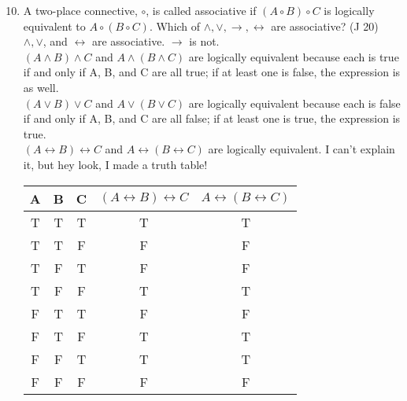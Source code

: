 \documentclass{article}
\begin{document}
\begin{enumerate}
    \setcounter{enumi}{9}
    \item A two-place connective, $\circ$, is called associative if $(A \circ B) \circ C$ is logically equivalent to $A \circ (B \circ C)$. Which of $\land, \lor, \to, \leftrightarrow$ are associative? (J 20)\\
          $\land, \lor$, and $\leftrightarrow$ are associative. $\to$ is not.\\
          $(A \land B) \land C$ and $A \land (B \land C)$ are logically equivalent because each is true if and only if A, B, and C are all true; if at least one is false, the expression is as well.\\
          $(A \lor B) \lor C$ and $A \lor (B \lor C)$ are logically equivalent because each is false if and only if A, B, and C are all false; if at least one is true, the expression is true.\\
          $(A \leftrightarrow B) \leftrightarrow C$ and $A \leftrightarrow (B \leftrightarrow C)$ are logically equivalent. I can't explain it, but hey look, I made a truth table!
          \begin{tabular}{c|c|c|c|c}
              A & B & C & $(A \leftrightarrow B) \leftrightarrow C$ & $A \leftrightarrow (B \leftrightarrow C)$ \\
              \hline
              T & T & T & T                                         & T                                         \\
              T & T & F & F                                         & F                                         \\
              T & F & T & F                                         & F                                         \\
              T & F & F & T                                         & T                                         \\
              F & T & T & F                                         & F                                         \\
              F & T & F & T                                         & T                                         \\
              F & F & T & T                                         & T                                         \\
              F & F & F & F                                         & F
          \end{tabular}\\

\end{enumerate}
\end{document}
